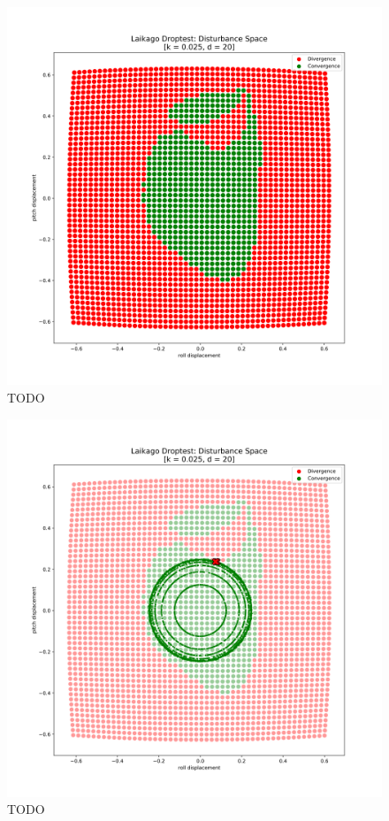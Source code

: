    \begin{figure}[h]\label{fig:drop}
    \centering
    \includegraphics[width=.7\linewidth]{figures/droptest_ds_v2.png}
    \caption{TODO}
    \end{figure}    

    \begin{figure}\label{fig:dropoverlay}
    \centering
    \includegraphics[width=.7\linewidth]{figures/droptest_ds_overay_v10000.png}
    \caption{TODO}
    \end{figure}

